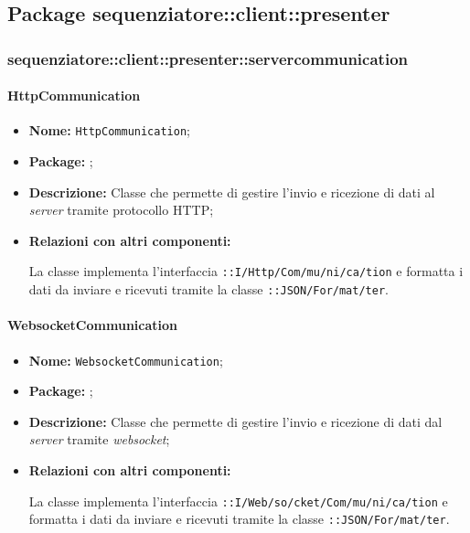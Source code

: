 \subsection{Package sequenziatore::client::presenter}



\subsubsection{sequenziatore::client::presenter::servercommunication}

\paragraph{HttpCommunication}
\begin{flushleft}
\begin{itemize}
\item \textbf{Nome:} \texttt{HttpCommunication};
\item \textbf{Package:} \texttt{\serverCommunication{}};
\item \textbf{Descrizione:} Classe che permette di gestire l'invio e ricezione di dati al \textit{server} tramite protocollo HTTP;
\item \textbf{Relazioni con altri componenti:}
\begin{sloppypar}
La classe implementa l'interfaccia \texttt{\iServerCommunication{}::I\fshyp{}Http\fshyp{}Com\fshyp{}mu\fshyp{}ni\fshyp{}ca\fshyp{}tion} e formatta i dati da inviare e ricevuti tramite la classe \texttt{\serverCommunication{}::JSON\fshyp{}For\fshyp{}mat\fshyp{}ter}.
\end{sloppypar}
\end{itemize}
\end{flushleft}

\paragraph{WebsocketCommunication}
\begin{flushleft}
\begin{itemize}
\item \textbf{Nome:} \texttt{WebsocketCommunication};
\item \textbf{Package:} \texttt{\serverCommunication{}};
\item \textbf{Descrizione:} Classe che permette di gestire l'invio e ricezione di dati dal \textit{server} tramite \textit{websocket};
\item \textbf{Relazioni con altri componenti:}
\begin{sloppypar}
La classe implementa l'interfaccia \texttt{\iServerCommunication{}::I\fshyp{}Web\fshyp{}so\fshyp{}cket\fshyp{}Com\fshyp{}mu\fshyp{}ni\fshyp{}ca\fshyp{}tion} e formatta i dati da inviare e ricevuti tramite la classe \texttt{\serverCommunication{}::JSON\fshyp{}For\fshyp{}mat\fshyp{}ter}.
\end{sloppypar}
\end{itemize}
\end{flushleft}

